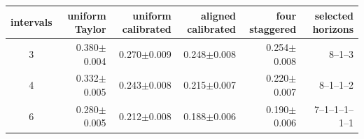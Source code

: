 \begin{tabular}{@{}crrrrr@{}}
\toprule
intervals & uniform Taylor & uniform calibrated & aligned calibrated & four staggered & selected horizons \\
\midrule
3 & 0.380$\pm$0.004 & 0.270$\pm$0.009 & 0.248$\pm$0.008 & 0.254$\pm$0.008 & 8--1--3 \\
4 & 0.332$\pm$0.005 & 0.243$\pm$0.008 & 0.215$\pm$0.007 & 0.220$\pm$0.007 & 8--1--1--2 \\
6 & 0.280$\pm$0.005 & 0.212$\pm$0.008 & 0.188$\pm$0.006 & 0.190$\pm$0.006 & 7--1--1--1--1--1 \\
\bottomrule
\end{tabular}
